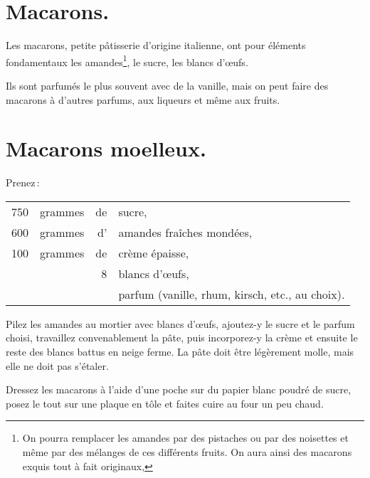 \section*{\centering Macarons.}
{}

Les macarons, petite pâtisserie d'origine italienne, ont pour éléments
fondamentaux les amandes\footnote{On pourra remplacer les amandes par des
pistaches ou par des noisettes et même par des mélanges de ces différents
fruits. On aura ainsi des macarons exquis tout à fait originaux,}, le sucre,
les blancs d'œufs.

Ils sont parfumés le plus souvent avec de la vanille, mais on peut faire des
macarons à d'autres parfums, aux liqueurs et même aux fruits.

\section*{\centering Macarons moelleux.}
{}

Prenez :

\footnotesize
\begin{longtable}{rrrp{16em}}
    750 & grammes & de & sucre,                                                                           \\
    600 & grammes & d' & amandes fraîches mondées,                                                        \\
    100 & grammes & de & crème épaisse,                                                                   \\
        &         &  8 & blancs d'œufs,                                                                   \\
        &         &    & parfum (vanille, rhum, kirsch, etc., au choix).                                  \\
\end{longtable}
\normalsize

Pilez les amandes au mortier avec {\mmm} blancs d'œufs, ajoutez-y le sucre
et le parfum choisi, travaillez convenablement la pâte, puis incorporez-y la
crème et ensuite le reste des blancs battus en neige ferme. La pâte doit être
légèrement molle, mais elle ne doit pas s'étaler.

Dressez les macarons à l'aide d'une poche sur du papier blanc poudré de sucre,
posez le tout sur une plaque en tôle et faites cuire au four un peu chaud.

